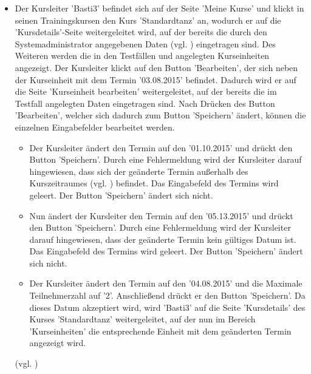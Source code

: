 \documentclass[a4paper]{scrreprt}
\begin{document}
\begin{itemize}
			\item {}
			Der Kursleiter 'Basti3' befindet sich auf der Seite 'Meine Kurse' und klickt in seinen Trainingskursen den Kurs 'Standardtanz' an, wodurch er auf die 'Kursdetails'-Seite weitergeleitet wird, auf der bereits die durch den Systemadministrator angegebenen Daten (vgl. ) eingetragen sind. Des Weiteren werden die in den Testfällen  und  angelegten Kurseinheiten angezeigt. Der Kursleiter klickt auf den Button 'Bearbeiten', der sich neben der Kurseinheit mit dem Termin '03.08.2015' befindet. Dadurch wird er auf die Seite 'Kurseinheit bearbeiten' weitergeleitet, auf der bereits die im Testfall  angelegten Daten eingetragen sind. Nach Drücken des Button 'Bearbeiten', welcher sich dadurch zum Button 'Speichern' ändert, können die einzelnen Eingabefelder bearbeitet werden. 
			\begin{itemize}
				\item Der Kursleiter ändert den Termin auf den '01.10.2015' und drückt den Button 'Speichern'. Durch eine Fehlermeldung wird der Kursleiter darauf hingewiesen, dass sich der geänderte Termin außerhalb des Kurszeitraumes (vgl. ) befindet. Das Eingabefeld des Termins wird geleert. Der Button 'Speichern' ändert sich nicht.
				
				\item Nun ändert der Kursleiter den Termin auf den '05.13.2015' und drückt den Button 'Speichern'. Durch eine Fehlermeldung wird der Kursleiter darauf hingewiesen, dass der geänderte Termin kein gültiges Datum ist. Das Eingabefeld des Termins wird geleert. Der Button 'Speichern' ändert sich nicht.
				
				\item Der Kursleiter ändert den Termin auf den '04.08.2015' und die Maximale Teilnehmerzahl auf '2'. Anschließend drückt er den Button 'Speichern'. Da dieses Datum akzeptiert wird, wird 'Basti3' auf die Seite 'Kursdetails' des Kurses 'Standardtanz' weitergeleitet, auf der nun im Bereich 'Kurseinheiten' die entsprechende Einheit mit dem geänderten Termin angezeigt wird.
			\end{itemize}
			(vgl. )
			

\end{itemize}
\end{document}
